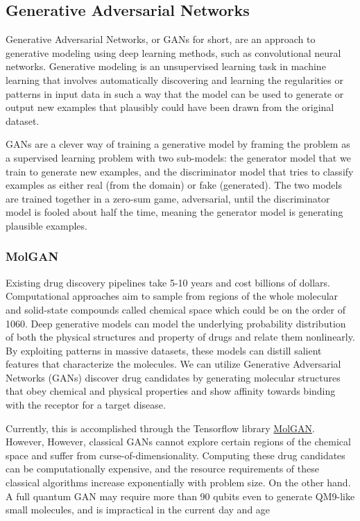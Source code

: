 \documentclass{scrartcl}
\begin{document}
\subsection{Generative Adversarial Networks}
\label{sec:orga307e01}

Generative Adversarial Networks, or GANs for short, are an approach to generative modeling using deep learning methods, such as convolutional neural networks. Generative modeling is an unsupervised learning task in machine learning that involves automatically discovering and learning the regularities or patterns in input data in such a way that the model can be used to generate or output new examples that plausibly could have been drawn from the original dataset.

GANs are a clever way of training a generative model by framing the problem as a supervised learning problem with two sub-models: the generator model that we train to generate new examples, and the discriminator model that tries to classify examples as either real (from the domain) or fake (generated). The two models are trained together in a zero-sum game, adversarial, until the discriminator model is fooled about half the time, meaning the generator model is generating plausible examples.

\subsubsection{MolGAN}
\label{sec:orge94d5d6}

Existing drug discovery pipelines take 5-10 years and cost billions of dollars. Computational approaches aim to sample from regions of the whole molecular and solid-state compounds called chemical space which could be on the order of 1060. Deep generative models can model the underlying probability distribution of both the physical structures and property of drugs and relate them nonlinearly. By exploiting patterns in massive datasets, these models can distill salient features that characterize the molecules. We can utilize Generative Adversarial Networks (GANs) discover drug candidates by generating molecular structures that obey chemical and physical properties and show affinity towards binding with the receptor for a target disease.

Currently, this is accomplished through the Tensorflow library \href{https://github.com/nicola-decao/MolGAN}{MolGAN}. However,  However, classical GANs cannot explore certain regions of the chemical space and suffer from curse-of-dimensionality. Computing these drug candidates can be computationally expensive, and the resource requirements of these classical algorithms increase exponentially with problem size. On the other hand. A full quantum GAN may require more than 90 qubits even to generate QM9-like small molecules, and is impractical in the current day and age
\end{document}
